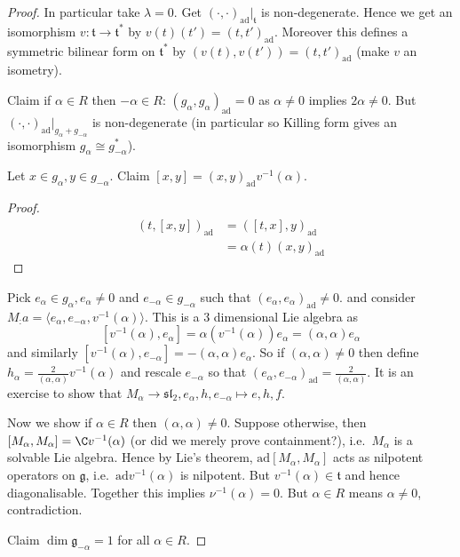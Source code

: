 \documentclass[a4paper]{article}
\newcommand*{\Lie}[1]{\mathfrak{#1}} %
\newcommand{\ad}{\mathrm{ad}} %
\begin{document}
\begin{proof}
  In particular take \(\lambda = 0\). Get \((\cdot, \cdot)_\ad|_{\Lie t}\) is non-degenerate. Hence we get an isomorphism \(v: \Lie t \to \Lie t^*\) by \(v(t)(t') = (t, t')_\ad\). Moreover this defines a symmetric bilinear form on \(\Lie t^*\) by \((v(t), v(t')) = (t, t')_\ad\) (make \(v\) an isometry).

  Claim if \(\alpha \in R\) then \(-\alpha \in R\): \((g_\alpha, g_\alpha)_\ad = 0\) as \(\alpha \neq 0\) implies \(2\alpha \neq 0\). But \((\cdot, \cdot)_\ad|_{g_\alpha + g_{-\alpha}}\) is non-degenerate (in particular so Killing form gives an isomorphism \(g_\alpha \cong g_{-\alpha}^*\)).

  Let \(x \in g_\alpha, y \in g_{-\alpha}\). Claim \([x, y] = (x, y)_\ad v^{-1}(\alpha)\).

  \begin{proof}
    \begin{align*}
      (t, [x, y])_\ad
      &= ([t, x], y)_\ad \\
      &= \alpha(t) (x, y)_\ad
    \end{align*}
  \end{proof}

  Pick \(e_\alpha \in g_\alpha, e_\alpha \ne 0\) and \(e_{-\alpha} \in g_{-\alpha}\) such that \((e_\alpha, e_{\alpha})_\ad \ne 0\). and consider \(M_:a = \langle e_\alpha, e_{-\alpha}, v^{-1}(\alpha) \rangle\). This is a 3 dimensional Lie algebra as
  \[
    [v^{-1}(\alpha), e_\alpha] = \alpha(v^{-1}(\alpha)) e_\alpha = (\alpha, \alpha) e_\alpha
  \]
  and similarly \([v^{-1}(\alpha), e_{-\alpha}] = -(\alpha, \alpha) e_\alpha\). So if \((\alpha, \alpha) \neq 0\) then define \(h_\alpha = \frac{2}{(\alpha, \alpha)} v^{-1}(\alpha)\) and rescale \(e_{-\alpha}\) so that \((e_\alpha, e_{-\alpha})_\ad = \frac{2}{(\alpha, \alpha)}\). It is an exercise to show that \(M_\alpha \to \Lie{sl}_2, e_\alpha, h, e_{-\alpha} \mapsto e, h, f\).

  Now we show if \(\alpha \in R\) then \((\alpha, \alpha) \neq 0\). Suppose otherwise, then \([M_\alpha, M_\alpha] = \C v^{-1}(\alpha)\) (or did we merely prove containment?), i.e.\ \(M_\alpha\) is a solvable Lie algebra. Hence by Lie's theorem, \(\ad[M_\alpha, M_\alpha]\) acts as nilpotent operators on \(\Lie g\), i.e.\ \(\ad v^{-1}(\alpha)\) is nilpotent. But \(v^{-1}(\alpha) \in \Lie t\) and hence diagonalisable. Together this implies \(\nu^{-1}(\alpha) = 0\). But \(\alpha \in R\) means \(\alpha \neq 0\), contradiction.

  Claim \(\dim \Lie g_{-\alpha} = 1\) for all \(\alpha \in R\).


\end{proof}
\end{document}
